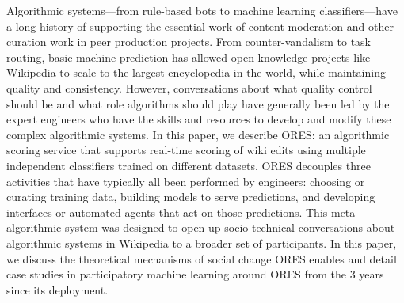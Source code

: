 Algorithmic systems---from rule-based bots to machine learning classifiers---have a long history of supporting the essential work of content moderation and other curation work in peer production projects.  From counter-vandalism to task routing, basic machine prediction has allowed open knowledge projects like Wikipedia to scale to the largest encyclopedia in the world, while maintaining quality and consistency.  However, conversations about what quality control should be and what role algorithms should play have generally been led by the expert engineers who have the skills and resources to develop and modify these complex algorithmic systems. In this paper, we describe ORES: an algorithmic scoring service that supports real-time scoring of wiki edits using multiple independent classifiers trained on different datasets. ORES decouples three activities that have typically all been performed by engineers: choosing or curating training data, building models to serve predictions, and developing interfaces or automated agents that act on those predictions. This meta-algorithmic system was designed to open up socio-technical conversations about algorithmic systems in Wikipedia to a broader set of participants.  In this paper, we discuss the theoretical mechanisms of social change ORES enables and detail case studies in participatory machine learning around ORES from the 3 years since its deployment.
